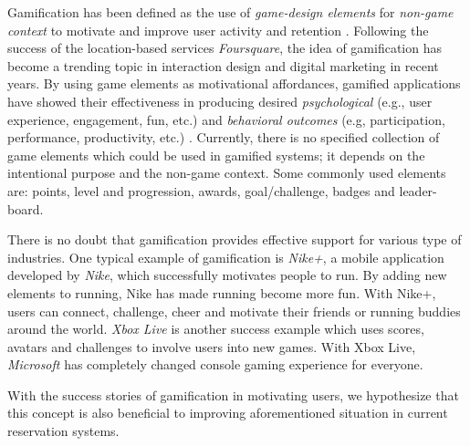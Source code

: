 Gamification has been defined as the use of \emph{game-design elements} for \emph{non-game context} to motivate and improve user activity and retention \cite{deterding2011game, hamari2014does}. Following the success of the location-based services \emph{Foursquare}, the idea of gamification has become a trending topic in interaction design and digital marketing \cite{deterding2011game} in recent years. By using game elements as motivational affordances, gamified applications have showed their effectiveness in producing desired \emph{psychological} (e.g., user experience, engagement, fun, etc.) and \emph{behavioral outcomes} (e.g, participation, performance, productivity, etc.) \cite{deterding2011game}. Currently, there is no specified collection of game elements which could be used in gamified systems; it depends on the intentional purpose and the non-game context. Some commonly used elements are: points, level and progression, awards, goal/challenge, badges and leader-board.

There is no doubt that gamification provides effective support for various type of industries. One typical example of gamification  is \emph{Nike+}, a mobile application developed by \emph{Nike}, which successfully motivates people to run. By adding new elements to running, Nike has made running become more fun. With Nike+, users can connect, challenge, cheer and motivate their friends or running buddies around the world. \emph{Xbox Live} is another success example which uses scores, avatars and challenges to involve users into new games. With Xbox Live, \emph{Microsoft} has completely changed console gaming experience for everyone.
 
With the success stories of gamification in motivating users, we hypothesize that this concept is also beneficial to improving aforementioned situation in current reservation systems.